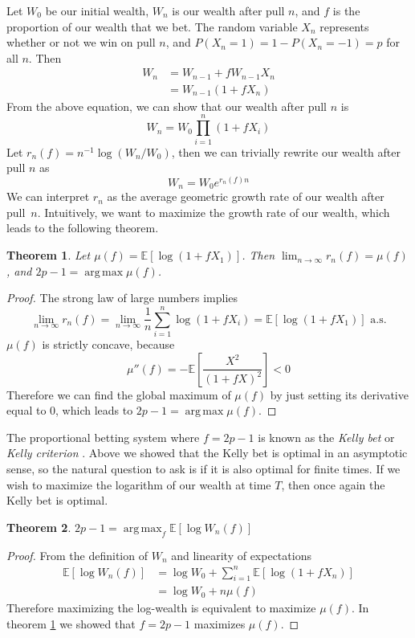 \documentclass[letterpaper]{article}
\DeclareMathOperator*{\argmax}{arg\,max}
\numberwithin{equation}{section}
\theoremstyle{plain}
\newtheorem{thm}{Theorem}[section]
\begin{document}
Let $W_0$ be our initial wealth, $W_n$ is our wealth after pull $n$, and $f$ is the proportion of our wealth that we bet. The random variable $X_n$ represents whether or not we win on pull $n$, and $P(X_n=1) = 1-P(X_n=-1) = p$ for all $n$. Then
\begin{align}
W_n &= W_{n-1} +fW_{n-1} X_n\\
&= W_{n-1} (1+fX_n)
\end{align}
From the above equation, we can show that our wealth after pull $n$ is
\begin{equation}
W_n = W_0 \prod_{i=1}^n (1+f X_i)
\end{equation}
Let $r_n(f) = n^{-1} \log (W_n / W_0)$, then we can trivially rewrite our wealth after pull $n$ as
\begin{equation}
W_n = W_0 e^{r_n(f) n}
\end{equation}
We can interpret $r_n$ as the average geometric growth rate of our wealth after pull~$n$. Intuitively, we want to maximize the growth rate of our wealth, which leads to the following theorem.
\begin{thm}\label{kelly_asymp_growth}
Let $\mu(f) = \mathbb{E}[\log(1+fX_1)]$. Then $\lim_{n\to\infty} r_n(f) = \mu(f)$, and $2p-1=\argmax \mu(f)$.
\end{thm}
\begin{proof}
The strong law of large numbers implies
\begin{equation}
\lim_{n\to\infty}  r_n(f) = \lim_{n\to\infty} \frac{1}{n} \sum_{i=1}^n \log(1+f X_i) = \mathbb{E}[\log(1+fX_1)] \text{ a.s.}
\end{equation}
$\mu(f)$ is strictly concave, because
\begin{equation}
\mu''(f) = -\mathbb{E}\left[\frac{X^2}{(1+fX)^2}\right] < 0
\end{equation}
Therefore we can find the global maximum of $\mu(f)$ by just setting its derivative equal to 0, which leads to $2p-1 = \argmax \mu(f)$.
\end{proof}
The proportional betting system where $f=2p-1$ is known as the \textit{Kelly bet} or \textit{Kelly criterion} \citep{kelly1956new,thorp2006kelly}. Above we showed that the Kelly bet is optimal in an asymptotic sense, so the natural question to ask is if it is also optimal for finite times. If we wish to maximize the logarithm of our wealth at time $T$, then once again the Kelly bet is optimal.
\begin{thm}
$2p-1= \argmax_f \mathbb{E}[\log W_n(f)]$
\end{thm}
\begin{proof}
From the definition of $W_n$ and linearity of expectations
\begin{align}
\mathbb{E}[\log W_n(f)] &= \log W_0 + \sum_{i=1}^n \mathbb{E}[\log (1+f X_n)]\\
&= \log W_0 + n \mu(f)
\end{align}
Therefore maximizing the log-wealth is equivalent to maximize $\mu(f)$. In theorem \ref{kelly_asymp_growth} we showed that $f = 2p-1$ maximizes $\mu(f)$.
\end{proof}
\end{document}
